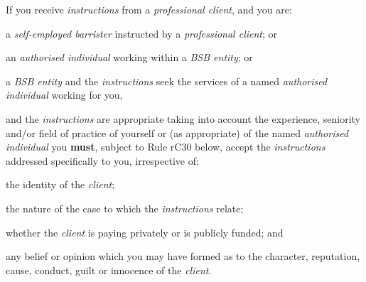 If you receive \emph{instructions} from a \emph{professional client},
and you are:
\begin{numlist}
\item a \emph{self-employed barrister} instructed by a \emph{professional
client}; or

\item an \emph{authorised individual} working within a \emph{BSB entity};
or

\item a \emph{BSB entity} and the \emph{instructions} seek the services of
a named \emph{authorised individual} working for you,

and the \emph{instructions} are appropriate taking into account the
experience, seniority and/or field of practice of yourself or (as
appropriate) of the named \emph{authorised individual} you \textcolor{myred}{\textbf{must}}, subject
to Rule rC30 below, accept the \emph{instructions} addressed
specifically to you, irrespective of:
\begin{alphlist}
\item the identity of the \emph{client};

\item the nature of the case to which the \emph{instructions} relate;

\item whether the \emph{client} is paying privately or is publicly funded;
and

\item any belief or opinion which you may have formed as to the character,
reputation, cause, conduct, guilt or innocence of the \emph{client}.
\end{alphlist}
\end{numlist}

